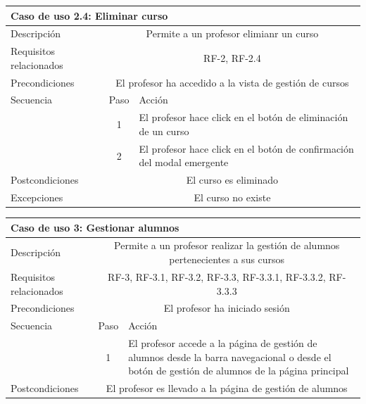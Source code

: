 \begin{adjustwidth}{-2cm}{}
\begin{tabular}[H]{l c l}
\toprule 
\multicolumn{3}{l}{\textbf{Caso de uso 2.4: Eliminar curso}}\\
\midrule
Descripción & \multicolumn{2}{p{10cm}}{Permite a un profesor elimianr un curso}\\
\midrule
Requisitos relacionados & \multicolumn{2}{p{10cm}}{RF-2, RF-2.4}\\
\midrule
Precondiciones & \multicolumn{2}{p{10cm}}{El profesor ha accedido a la vista de gestión de cursos}\\
\midrule
Secuencia & Paso & Acción \\
\cmidrule{2-3}
         & 1 &  \multicolumn{1}{p{8cm}}{El profesor hace click en el botón de eliminación de un curso}\\
         & 2 &  \multicolumn{1}{p{8cm}}{El profesor hace click en el botón de confirmación del modal emergente}\\

\midrule
Postcondiciones & \multicolumn{2}{p{10cm}}{El curso es eliminado}\\
\midrule
Excepciones & \multicolumn{2}{p{10cm}}{El curso no existe}\\
\bottomrule 
\end{tabular}


\hspace{3cm}


\begin{tabular}[H]{l c l}
\toprule 
\multicolumn{3}{l}{\textbf{Caso de uso 3: Gestionar alumnos}}\\
\midrule
Descripción & \multicolumn{2}{p{10cm}}{Permite a un profesor realizar la gestión de alumnos pertenecientes a sus cursos}\\
\midrule
Requisitos relacionados & \multicolumn{2}{p{10cm}}{RF-3, RF-3.1, RF-3.2, RF-3.3, RF-3.3.1, RF-3.3.2, RF-3.3.3}\\
\midrule
Precondiciones & \multicolumn{2}{p{10cm}}{El profesor ha iniciado sesión}\\
\midrule
Secuencia & Paso & Acción \\
\cmidrule{2-3}
         & 1 & \multicolumn{1}{p{8cm}}{El profesor accede a la página de gestión de alumnos desde la barra navegacional o desde el botón de gestión de alumnos de la página principal} \\
\midrule
Postcondiciones & \multicolumn{2}{p{10cm}}{El profesor es llevado a la página de gestión de alumnos}\\
\bottomrule 
\end{tabular}
\end{adjustwidth}

